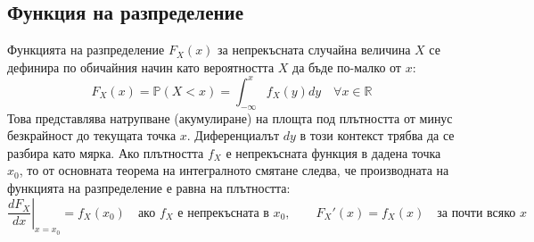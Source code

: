 \subsection{Функция на разпределение}

Функцията на разпределение $F_X(x)$ за непрекъсната случайна величина $X$ се дефинира по обичайния начин като вероятността $X$ да бъде по-малко от $x$:
\[
F_X(x) = \mathbb{P}(X < x) = \int_{-\infty}^{x} f_X(y) dy \quad \forall x \in \mathbb{R}
\]
Това представлява натрупване (акумулиране) на площта под плътността от минус безкрайност до текущата точка $x$. Диференциалът $dy$ в този контекст трябва да се разбира като мярка.
Ако плътността $f_X$ е непрекъсната функция в дадена точка $x_0$, то от основната теорема на интегралното смятане следва, че производната на функцията на разпределение е равна на плътността:
\[
\left. \frac{dF_X}{dx} \right|_{x=x_0} = f_X(x_0)\quad\text{ако $f_X$ е непрекъсната в $x_0$},
\qquad F_X'(x)=f_X(x)\quad\text{за почти всяко $x$}
\]


